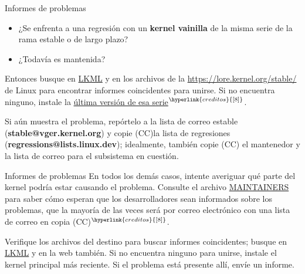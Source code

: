 \begin{frame}[c]{Informes de problemas}

  \begin{itemize}
    \item ¿Se enfrenta a una regresión con un \textbf{kernel vainilla}
      de la misma serie de la rama estable o de largo plazo?
    \item ¿Todavía es mantenida?
  \end{itemize}

  \vspace{\baselineskip}
  Entonces busque en \href{https://lore.kernel.org/lkml/}{LKML} y en
  los archivos de la \href{lista de correo
  estable}{https://lore.kernel.org/stable/} de Linux para encontrar
  informes coincidentes para unirse. Si no encuentra ninguno, instale
  la \href{https://kernel.org/}{última versión de esa
  serie}$^{\hyperlink{creditos}{[8]}}$.

  \vspace{\baselineskip}
  Si aún muestra el problema, repórtelo a la lista de correo estable
  (\textbf{stable@vger.kernel.org}) y copie (CC)la lista de regresiones
  (\textbf{regressions@lists.linux.dev}); idealmente, también copie (CC)
  el mantenedor y la lista de correo para el subsistema en cuestión.
\end{frame}

\begin{frame}[c]{Informes de problemas}
  En todos los demás casos, intente averiguar qué parte del kernel podría
  estar causando el problema. Consulte el archivo
  \href{https://git.kernel.org/pub/scm/linux/kernel/git/torvalds/linux.git/tree/MAINTAINERS}
  {MAINTAINERS} para saber cómo esperan que los desarrolladores
  sean informados sobre los problemas, que la mayoría de las veces será
  por correo electrónico con una lista de correo en copia
  (CC)$^{\hyperlink{creditos}{[8]}}$.

  \vspace{\baselineskip}
  Verifique los archivos del destino para buscar informes coincidentes;
  busque en \href{https://lore.kernel.org/lkml/}{LKML} y en la web también.
  Si no encuentra ninguno para unirse, instale el kernel principal más
  reciente. Si el problema está presente allí, envíe un informe.

\end{frame}


